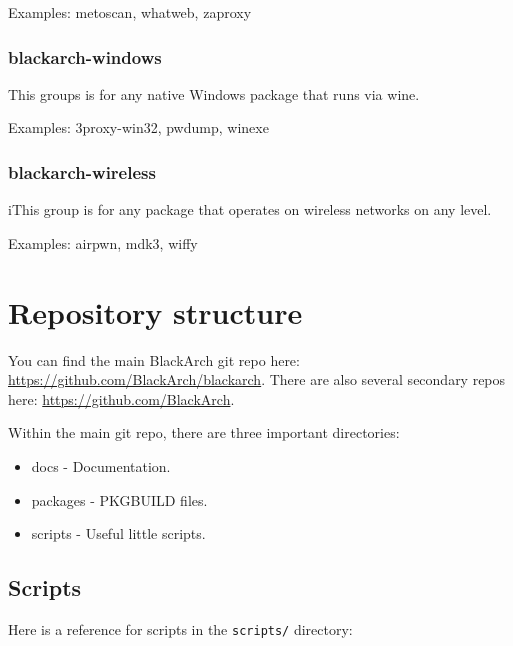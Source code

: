 \documentclass[a4paper, oneside, 11pt]{book}
\begin{document}
Examples: metoscan, whatweb, zaproxy

\subsubsection{blackarch-windows}

This groups is for any native Windows package that runs via wine.

Examples: 3proxy-win32, pwdump, winexe

\subsubsection{blackarch-wireless}

iThis group is for any package that operates on wireless networks on any level.

Examples: airpwn, mdk3, wiffy

\section{Repository structure}

You can find the main BlackArch git repo here:
\href{https://github.com/BlackArch/blackarch}{https://github.com/BlackArch/blackarch}. There are
also several secondary repos here:
\href{https://github.com/BlackArch}{https://github.com/BlackArch}.

Within the main git repo, there are three important directories:

\begin{itemize}
	\item docs - Documentation.
	\item packages - PKGBUILD files.
	\item scripts - Useful little scripts.
\end{itemize}

\subsection{Scripts}

Here is a reference for scripts in the \verb|scripts/| directory:
\end{document}
